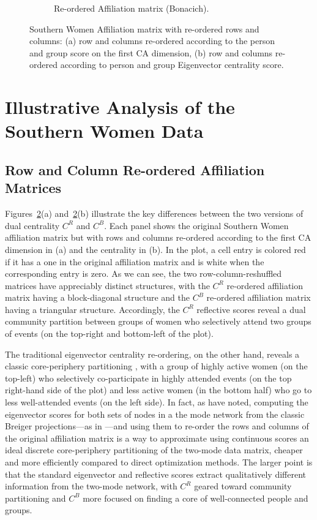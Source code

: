 \documentclass[a4paper,fleqn]{cas-sc}
\begin{document}
\begin{figure}[ht!]
\begin{subfigure}[b]{0.45\textwidth}
            \caption{Re-ordered Affiliation matrix (Bonacich).}
            \label{fig:bon-reord}
    \end{subfigure}
    \caption{Southern Women Affiliation matrix with re-ordered rows and columns: (a) row and columns re-ordered according to the person and group score on the first CA dimension, (b) row and columns re-ordered according to person and group Eigenvector centrality score.}
    \label{fig:ca-v-bon}
\end{figure}

\section{Illustrative Analysis of the Southern Women Data} \label{sec:anal}
\subsection{Row and Column Re-ordered Affiliation Matrices}
Figures~\ref{fig:ca-v-bon}(a) and~\ref{fig:ca-v-bon}(b) illustrate the key differences between the two versions of dual centrality $C^R$ and $C^B$. Each panel shows the original Southern Women affiliation matrix but with rows and columns re-ordered according to the first CA dimension in (a) and the \citet{bonacich1991simultaneous} centrality in (b). In the plot, a cell entry is colored red if it has a one in the original affiliation matrix and is white when the corresponding entry is zero. As we can see, the two row-column-reshuffled matrices have appreciably distinct structures, with the $C^R$ re-ordered affiliation matrix having a block-diagonal structure and the $C^B$ re-ordered affiliation matrix having a triangular structure. Accordingly, the $C^R$ reflective scores reveal a dual community partition between groups of women who selectively attend two groups of events (on the top-right and bottom-left of the plot). 

The traditional eigenvector centrality re-ordering, on the other hand, reveals a classic core-periphery partitioning \citep{borgatti2000models}, with a group of highly active women (on the top-left) who selectively co-participate in highly attended events (on the top right-hand side of the plot) and less active women (in the bottom half) who go to less well-attended events (on the left side). In fact, as \citet[p. 206-207]{everett2013dual} have noted, computing the eigenvector scores for both sets of nodes in a the mode network from the classic Breiger projections---as in \citet{bonacich1991simultaneous}---and using them to re-order the rows and columns of the original affiliation matrix is a way to approximate using continuous scores an ideal discrete core-periphery partitioning of the two-mode data matrix, cheaper and more efficiently compared to direct optimization methods.  The larger point is that the standard eigenvector and reflective scores extract qualitatively different information from the two-mode network, with $C^R$ geared toward community partitioning and $C^B$ more focused on finding a core of well-connected people and groups. 
\end{document}
